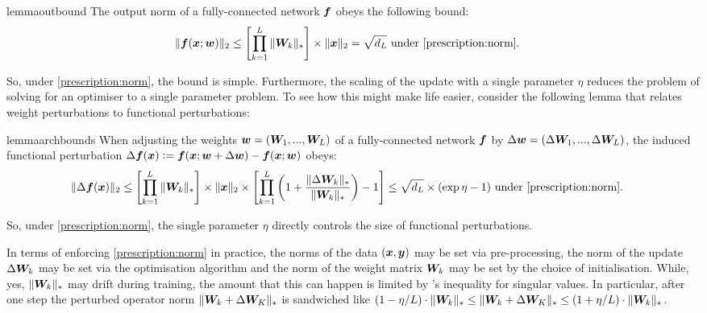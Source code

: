 \begin{restatable}{lemma}{outbound}
\label{lem:outbound} The output norm of a fully-connected network ${\bm{f}}$ obeys the following bound:
\begin{align*}
    \norm{\vf(\vx;\vw)}_2 &\leq \left[\prod_{k=1}^L \norm{\mW_k}_* \right] \times \norm{\vx}_2 = \sqrt{d_L} \text{ under \cref{prescription:norm}}.
\end{align*}
\end{restatable}

So, under \cref{prescription:norm}, the bound is simple. Furthermore, the scaling of the update with a single parameter $\eta$ reduces the problem of solving for an optimiser to a single parameter problem. To see how this might make life easier, consider the following lemma that relates weight perturbations to functional perturbations:

\begin{restatable}{lemma}{archbounds}
\label{lem:deep_perturbation_bounds}
When adjusting the weights ${\bm{w}} = ({\bm{W}}_1,...,{\bm{W}}_L)$ of a fully-connected network ${\bm{f}}$ by $\Delta{\bm{w}} = (\Delta{\bm{W}}_1,...,\Delta{\bm{W}}_L)$, the induced functional perturbation $\Delta {\bm{f}}({\bm{x}})\vcentcolon={\bm{f}}({\bm{x}};{\bm{w}}+\Delta{\bm{w}})-{\bm{f}}({\bm{x}};{\bm{w}})$ obeys:
\begin{align*}
    \norm{\Delta\vf(\vx)}_2 &\leq \left[\prod_{k=1}^L \norm{\mW_k}_* \right] \times \norm{\vx}_2 \times \left[ \prod_{k = 1}^L \left( 1 + \frac{\Vert \Delta \mW_k \Vert_{*}}{\Vert \mW_k \Vert_{*}}\right)  - 1 \right] \leq \sqrt{d_L}\times(\exp \eta - 1) \text{ under \cref{prescription:norm}}.
\end{align*}
\end{restatable}
So, under \cref{prescription:norm}, the single parameter $\eta$ directly controls the size of functional perturbations.

In terms of enforcing \cref{prescription:norm} in practice, the norms of the data $({\bm{x}},{\bm{y}})$ may be set via pre-processing, the norm of the update $\Delta {\bm{W}}_k$ may be set via the optimisation algorithm and the norm of the weight matrix ${\bm{W}}_k$ may be set by the choice of initialisation. While, yes, $\Vert {{\bm{W}}_k} \Vert_*$ may drift during training, the amount that this can happen is limited by \citet{Weyl1912}'s inequality for singular values. In particular, after one step the perturbed operator norm $\Vert {{\bm{W}}_k + \Delta {\bm{W}}_K} \Vert_*$ is sandwiched like $(1-\eta/L) \cdot \Vert {{\bm{W}}_k} \Vert_* \leq \Vert {{\bm{W}}_k + \Delta {\bm{W}}_K} \Vert_* \leq (1+\eta/L) \cdot\Vert {{\bm{W}}_k} \Vert_*$.


